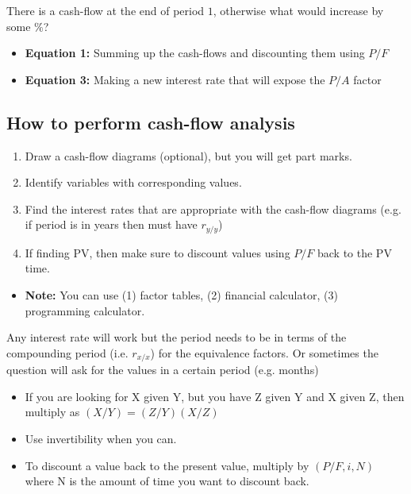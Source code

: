     \begin{derivation}
        There is a cash-flow at the end of period $1$, otherwise what would increase by some $\%$?
        \begin{itemize}
            \item \textbf{Equation 1:} Summing up the cash-flows and discounting them using $P/F$
            \item \textbf{Equation 3:} Making a new interest rate that will expose the $P/A$ factor
        \end{itemize}
    \end{derivation}

\subsection{How to perform cash-flow analysis}
\begin{process}
    \begin{enumerate}
        \item Draw a cash-flow diagrams (optional), but you will get part marks.
        \item Identify variables with corresponding values.
        \item Find the interest rates that are appropriate with the cash-flow diagrams (e.g. if period is in years then must have $r_{y/y}$)
        \item If finding PV, then make sure to discount values using $P/F$ back to the PV time.
    \end{enumerate}
    \begin{itemize}
        \item \textbf{Note:} You can use (1) factor tables, (2) financial calculator, (3) programming calculator.
    \end{itemize}
\end{process}

\begin{warning}
    Any interest rate will work but the period needs to be in terms of the compounding period (i.e. $r_{x/x}$) for the equivalence factors. Or sometimes the question will ask for the values in a certain period (e.g. months)
\end{warning}

\begin{intuition}
    \begin{itemize}
        \item If you are looking for X given Y, but you have Z given Y and X given Z, then multiply as $(X/Y)=(Z/Y)(X/Z)$
        \item Use invertibility when you can.
        \item To discount a value back to the present value, multiply by $(P/F,i,N)$ where N is the amount of time you want to discount back.
    \end{itemize}
\end{intuition}